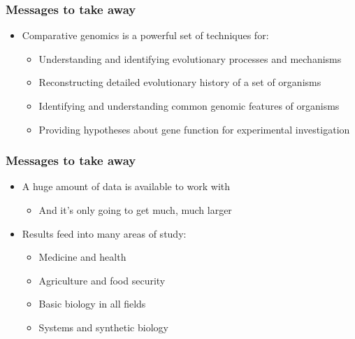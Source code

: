 \begin{frame}
  \frametitle{Messages to take away}
  \begin{itemize}
    \item   \textcolor{hutton_green}{Comparative genomics is a powerful set of techniques for:}
    \begin{itemize}
      \item Understanding and identifying evolutionary processes and mechanisms
      \item Reconstructing detailed evolutionary history of a set of organisms
      \item Identifying and understanding common genomic features of organisms
      \item Providing hypotheses about gene function for experimental investigation
    \end{itemize}
  \end{itemize}
\end{frame}

\begin{frame}
  \frametitle{Messages to take away}
  \begin{itemize}
    \item \textcolor{hutton_blue}{A huge amount of data is available to work with}
    \begin{itemize}
      \item And it's only going to get much, much larger
    \end{itemize}
    \item \textcolor{hutton_purple}{Results feed into many areas of study:}
    \begin{itemize}
      \item Medicine and health
      \item Agriculture and food security
      \item Basic biology in all fields
      \item Systems and synthetic biology
    \end{itemize}
  \end{itemize}
\end{frame}

